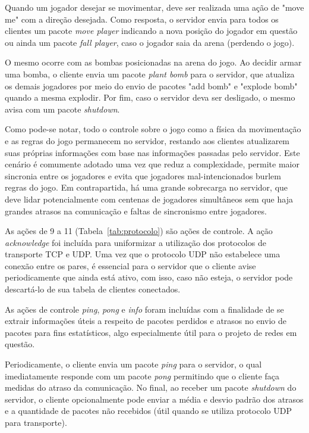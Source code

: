 \documentclass[12pt]{article}
\begin{document}
Quando um jogador desejar se movimentar, deve ser realizada uma ação de "move
me" com a direção desejada. Como resposta, o servidor envia para todos os
clientes um pacote \textit{move player} indicando a nova posição do jogador em
questão ou ainda um pacote \textit{fall player}, caso o jogador saia da arena
(perdendo o jogo).

O mesmo ocorre com as bombas posicionadas na arena do jogo. Ao decidir armar
uma bomba, o cliente envia um pacote \textit{plant bomb} para o servidor, que
atualiza os demais jogadores por meio do envio de pacotes "add bomb" e "explode
bomb" quando a mesma explodir. Por fim, caso o servidor deva ser desligado, o
mesmo avisa com um pacote \textit{shutdown}.

Como pode-se notar, todo o controle sobre o jogo como a física da movimentação
e as regras do jogo permanecem no servidor, restando aos clientes atualizarem
suas próprias informações com base nas informações passadas pelo servidor. Este
cenário é comumente adotado uma vez que reduz a complexidade, permite maior
sincronia entre os jogadores e evita que jogadores mal-intencionados burlem
regras do jogo. Em contrapartida, há uma grande sobrecarga no servidor, que
deve lidar potencialmente com centenas de jogadores simultâneos sem que haja
grandes atrasos na comunicação e faltas de sincronismo entre jogadores.

As ações de 9 a 11 (Tabela~\ref{tab:protocolo}) são ações de controle. A ação
\textit{acknowledge} foi incluída para uniformizar a utilização dos protocolos
de transporte TCP e UDP. Uma vez que o protocolo UDP não estabelece uma
conexão entre os pares, é essencial para o servidor que o cliente avise
periodicamente que ainda está ativo, com isso, caso não esteja, o servidor pode
descartá-lo de sua tabela de clientes conectados.

As ações de controle \textit{ping}, \textit{pong} e \textit{info} foram
incluídas com a finalidade de se extrair informações úteis a respeito de
pacotes perdidos e atrasos no envio de pacotes para fins estatísticos, algo
especialmente útil para o projeto de redes em questão.

Periodicamente, o cliente envia um pacote \textit{ping} para o servidor, o qual
imediatamente responde com um pacote \textit{pong} permitindo que o cliente
faça medidas do atraso da comunicação. No final, ao receber um pacote
\textit{shutdown} do servidor, o cliente opcionalmente pode enviar a média e
desvio padrão dos atrasos e a quantidade de pacotes não recebidos (útil quando
se utiliza protocolo UDP para transporte).
\end{document}
